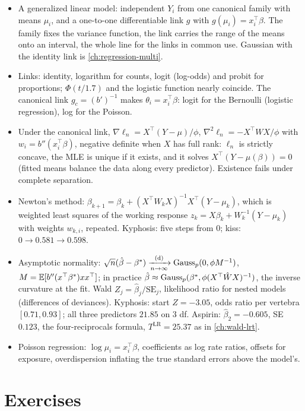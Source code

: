 \begin{itemize}[nosep]
\item A generalized linear model: independent $Y_i$ from one canonical family with means $\mu_i$, and a one-to-one differentiable link $g$ with $g(\mu_i) = x_i^\top\beta$. The family fixes the variance function, the link carries the range of the means onto an interval, the whole line for the links in common use. Gaussian with the identity link is \cref{ch:regression-multi}.
\item Links: identity, logarithm for counts, logit (log-odds) and probit for proportions; $\Phi(t/1.7)$ and the logistic function nearly coincide. The canonical link $g_c = (b')^{-1}$ makes $\theta_i = x_i^\top\beta$: logit for the Bernoulli (logistic regression), log for the Poisson.
\item Under the canonical link, $\nabla\ell_n = X^\top(Y - \mu)/\phi$, $\nabla^2\ell_n = -X^\top WX/\phi$ with $w_i = b''(x_i^\top\beta)$, negative definite when $X$ has full rank: $\ell_n$ is strictly concave, the MLE is unique if it exists, and it solves $X^\top(Y - \mu(\beta)) = 0$ (fitted means balance the data along every predictor). Existence fails under complete separation.
\item Newton's method: $\beta_{k+1} = \beta_k + (X^\top W_kX)^{-1}X^\top(Y - \mu_k)$, which is weighted least squares of the working response $z_k = X\beta_k + W_k^{-1}(Y - \mu_k)$ with weights $w_{k,i}$, repeated. Kyphosis: five steps from $0$; kiss: $0 \to 0.581 \to 0.598$.
\item Asymptotic normality: $\sqrt{n}(\hat{\beta} - \beta^*) \xrightarrow [n \to \infty ]{\text{(d)}} \text{Gauss}_p(0, \phi M^{-1})$, $M = \operatorname*{\mathbb{E}}[b''(x^\top\beta^*)xx^\top]$; in practice $\hat{\beta} \approx \text{Gauss}_p(\beta^*, \phi(X^\top\hat{W}X)^{-1})$, the inverse curvature at the fit. Wald $Z_j = \hat{\beta}_j/\mathrm{SE}_j$, likelihood ratio for nested models (differences of deviances). Kyphosis: start $Z = -3.05$, odds ratio per vertebra $[0.71, 0.93]$; all three predictors $21.85$ on $3$ df. Aspirin: $\hat{\beta}_2 = -0.605$, SE $0.123$, the four-reciprocals formula, $T^{\mathrm{LR}} = 25.37$ as in \cref{ch:wald-lrt}.
\item Poisson regression: $\log\mu_i = x_i^\top\beta$, coefficients as log rate ratios, offsets for exposure, overdispersion inflating the true standard errors above the model's.
\end{itemize}

\section{Exercises}
\label{sec:glm-exercises}

